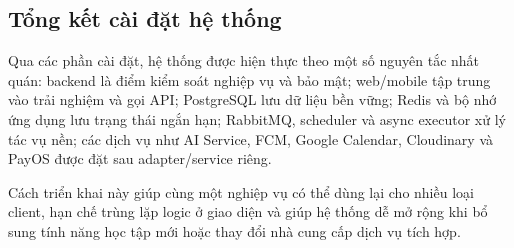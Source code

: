 \subsection{Tổng kết cài đặt hệ thống}
\label{subsec:implementation-summary}

Qua các phần cài đặt, hệ thống được hiện thực theo một số nguyên tắc nhất quán: backend là điểm kiểm soát nghiệp vụ và bảo mật; web/mobile tập trung vào trải nghiệm và gọi API; PostgreSQL lưu dữ liệu bền vững; Redis và bộ nhớ ứng dụng lưu trạng thái ngắn hạn; RabbitMQ, scheduler và async executor xử lý tác vụ nền; các dịch vụ như AI Service, FCM, Google Calendar, Cloudinary và PayOS được đặt sau adapter/service riêng.

Cách triển khai này giúp cùng một nghiệp vụ có thể dùng lại cho nhiều loại client, hạn chế trùng lặp logic ở giao diện và giúp hệ thống dễ mở rộng khi bổ sung tính năng học tập mới hoặc thay đổi nhà cung cấp dịch vụ tích hợp.